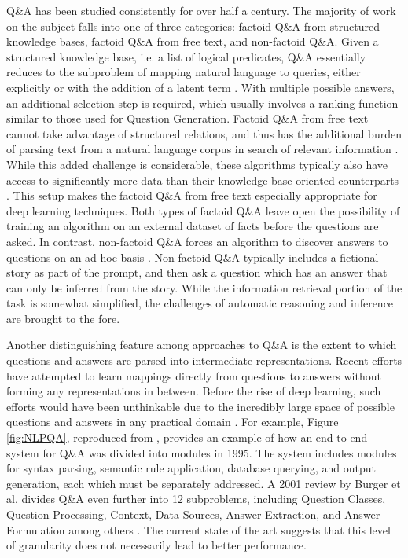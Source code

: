 Q\&A has been studied consistently for over half a century. The majority of work on the subject falls into one of three categories: factoid Q\&A from structured knowledge bases, factoid Q\&A from free text, and non-factoid Q\&A. Given a structured knowledge base, i.e. a list of logical predicates, Q\&A essentially reduces to the subproblem of mapping natural language to queries, either explicitly or with the addition of a latent term \cite{yao2014information, zelle1996learning}. With multiple possible answers, an additional selection step is required, which usually involves a ranking function similar to those used for Question Generation. Factoid Q\&A from free text cannot take advantage of structured relations, and thus has the additional burden of parsing text from a natural language corpus in search of relevant information \cite{ravichandran2002learning}. While this added challenge is considerable, these algorithms typically also have access to significantly more data than their knowledge base oriented counterparts \cite{brill2001data, hermann2015teaching}. This setup makes the factoid Q\&A from free text especially appropriate for deep learning techniques. Both types of factoid Q\&A leave open the possibility of training an algorithm on an external dataset of facts before the questions are asked. In contrast, non-factoid Q\&A forces an algorithm to discover answers to questions on an ad-hoc basis \cite{soricut2004automatic}. Non-factoid Q\&A typically includes a fictional story as part of the prompt, and then ask a question which has an answer that can only be inferred from the story. While the information retrieval portion of the task is somewhat simplified, the challenges of automatic reasoning and inference are brought to the fore.

Another distinguishing feature among approaches to Q\&A is the extent to which questions and answers are parsed into intermediate representations. Recent efforts have attempted to learn mappings directly from questions to answers without forming any representations in between. Before the rise of deep learning, such efforts would have been unthinkable due to the incredibly large space of possible questions and answers in any practical domain \cite{hirschman2001natural}. For example, Figure \ref{fig:NLPQA}, reproduced from \cite{androutsopoulos1995natural}, provides an example of how an end-to-end system for Q\&A was divided into modules in 1995. The system includes modules for syntax parsing, semantic rule application, database querying, and output generation, each which must be separately addressed. A 2001 review by Burger et al. divides Q\&A even further into 12 subproblems, including Question Classes, Question Processing, Context, Data Sources, Answer Extraction, and Answer Formulation among others \cite{burger2001issues}. The current state of the art suggests that this level of granularity does not necessarily lead to better performance.  

